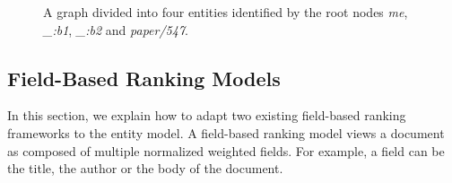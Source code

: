 %

\begin{figure}
\centering
{}
\caption{A graph divided into four entities identified by the root nodes \emph{me}, \emph{\_:b1}, \emph{\_:b2} and \emph{paper/547}.}
\label{fig:rdf-graph}
\end{figure}

\subsection{Field-Based Ranking Models}
\label{sec:ranking-wod}

In this section, we explain how to adapt two existing \gls{field}-based ranking frameworks to the entity model.
A field-based ranking model views a document as composed of multiple normalized weighted fields. For example, a field can be the title, the author or the body of the document.

